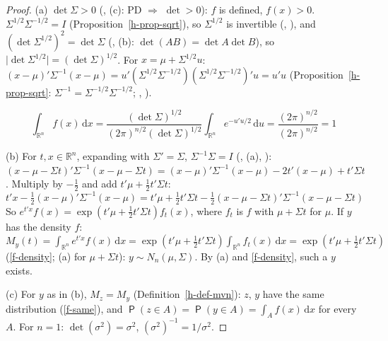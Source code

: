 \documentclass[12pt]{article}
\newcommand{\R}{\mathbb R}
\DeclareMathOperator\prb{\mathsf{P}}
\theoremstyle{definition}
\begin{document}
\begin{proof}
(a) \(\det\Sigma>0\) (, (c): PD \(\Rightarrow\) \(\det>0\)): \(f\) is defined, \(f(x)>0\). \(\Sigma^{1/2}\Sigma^{-1/2}=I\) (Proposition~\ref{h-prop-sqrt}), so \(\Sigma^{1/2}\) is invertible (, ), and
\((\det\Sigma^{1/2})^2=\det\Sigma\) (, (b): \(\det(AB)=\det A\det B\)), so
\(\lvert\det\Sigma^{1/2}\rvert=(\det\Sigma)^{1/2}\). For \(x=\mu+\Sigma^{1/2}u\):
\((x-\mu)'\Sigma^{-1}(x-\mu)=u'(\Sigma^{1/2}\Sigma^{-1/2})(\Sigma^{1/2}\Sigma^{-1/2})'u=u'u\)
(Proposition~\ref{h-prop-sqrt}: \(\Sigma^{-1}=\Sigma^{-1/2}\Sigma^{-1/2}\); , ).
\begin{board}[\ref{f-integrals} with \(g=f\), \(c=\mu\), \(B=\Sigma^{1/2}\):]
\[
\int_{\R^n}f(x)\,\mathrm{d}x=\frac{(\det\Sigma)^{1/2}}{(2\pi)^{n/2}(\det\Sigma)^{1/2}}\int_{\R^n}e^{-u'u/2}\,\mathrm{d}u
=\frac{(2\pi)^{n/2}}{(2\pi)^{n/2}}=1
\]
\end{board}
(b) For \(t,x\in\R^n\), expanding with \(\Sigma'=\Sigma\), \(\Sigma^{-1}\Sigma=I\) (, (a), ):
\((x-\mu-\Sigma t)'\Sigma^{-1}(x-\mu-\Sigma t)=(x-\mu)'\Sigma^{-1}(x-\mu)-2t'(x-\mu)+t'\Sigma t\). Multiply by
\(-\frac12\) and add \(t'\mu+\frac12t'\Sigma t\):
\[
t'x-\tfrac12(x-\mu)'\Sigma^{-1}(x-\mu)=t'\mu+\tfrac12t'\Sigma t-\tfrac12(x-\mu-\Sigma t)'\Sigma^{-1}(x-\mu-\Sigma t)
\]
So \(e^{t'x}f(x)=\exp(t'\mu+\frac12t'\Sigma t)f_t(x)\), where \(f_t\) is \(f\) with \(\mu+\Sigma t\) for \(\mu\). If \(y\)
has the density \(f\): \(M_y(t)=\int_{\R^n}e^{t'x}f(x)\,\mathrm{d}x=\exp(t'\mu+\frac12t'\Sigma t)\int_{\R^n}f_t(x)\,\mathrm{d}
x=\exp(t'\mu+\frac12t'\Sigma t)\) (\ref{f-density}; (a) for \(\mu+\Sigma t\)): \(y\sim N_n(\mu,\Sigma)\). By (a) and
\ref{f-density}, such a \(y\) exists.

(c) For \(y\) as in (b), \(M_z=M_y\) (Definition~\ref{h-def-mvn}): \(z\), \(y\) have the same distribution
(\ref{f-same}), and \(\prb(z\in A)=\prb(y\in A)=\int_Af(x)\,\mathrm{d}x\) for every \(A\). For \(n=1\):
\(\det(\sigma^2)=\sigma^2\), \((\sigma^2)^{-1}=1/\sigma^2\).
\end{proof}
\end{document}
